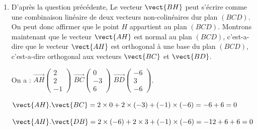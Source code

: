 \begin{enumerate}
\begin{enumerate}
$\left\{\begin{array}{l c l} -6\beta&=&-1\\-3\alpha+3\beta &=& -1\\-6\alpha-6\beta&=&-4	\end{array}\right. \iff 
\left\{\begin{array}{l c l} \beta&=&\dfrac16\\-3\alpha &=& -1-\dfrac36\\-6\alpha&=&-4+1	\end{array}\right. \iff
 \left\{\begin{array}{l c l} \beta&=&\dfrac16\\-3\alpha &=& -\dfrac32\\6\alpha&=&-3	\end{array}\right.$
		 
		 $\iff \left\{\begin{array}{l c l} \beta&=&\dfrac16\\\alpha &=& \dfrac12\end{array}\right. $. \quad Donc $\vect{BH}=\dfrac12 \vect{BC}+\dfrac16 \vect{BD}$.
		\item D'après la question précédente, Le vecteur $\vect{BH}$ peut s'écrire comme une combinaison linéaire de deux vecteurs non-colinéaires dur plan $(BCD)$. On peut donc affirmer que le point $H$ appartient au plan $(BCD)$. Montrons maintenant que le vecteur $\vect{AH}$ est normal au plan $(BCD)$, c'est-a-dire que le vecteur $\vect{AH}$ est orthogonal à une base du plan $(BCD)$, c'est-a-dire orthogonal aux vecteurs $\vect{BC}$ et $\vect{BD}$.
		
		On a : \(\overrightarrow{AH}\begin{pmatrix}2\\2\\-1\end{pmatrix}\) \quad \(\overrightarrow{BC}\begin{pmatrix}0\\-3\\6\end{pmatrix}\) \quad \(\overrightarrow{BD}\begin{pmatrix}-6\\3\\-6\end{pmatrix}\).
		
		$\vect{AH}.\vect{BC}= 2\times 0+2\times (-3)+(-1)\times (-6)=-6+6=0$
		
		$\vect{AH}.\vect{DB}= 2\times (-6)+2\times 3+(-1)\times (-6)=-12+6+6=0$
		

\end{enumerate}
\end{enumerate}
